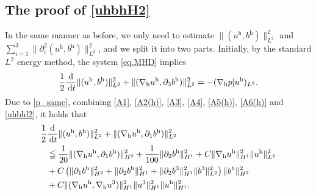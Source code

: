 \documentclass[11pt]{amsart}
\theoremstyle{definition}
\newcommand{\h}{\mathrm{h}}
\newcommand{\dt}{\,{\rm d}t}
\newcommand{\nablah}{\nabla_{\mathrm{h}}}
\numberwithin{equation}{section}
\begin{document}
\subsection{The proof of \eqref{uhbhH2}}
In the same manner as before, we only need to  estimate  $\|(u^\mathrm{h},b^\mathrm{h})\|_{L^2}^2$ and $\sum_{i=1}^{3}\|\partial_{i}^2(u^\mathrm{h},b^\mathrm{h})\|_{L^2}^{2}$, and we split it into  two parts. Initially, by the standard $L^2$ energy method, the system \eqref{eq.MHD} implies
\begin{align}\label{uhbhl2}
	\frac12\frac{\mathrm{d}}{\dt}  \|(u^\mathrm{h},b^\mathrm{h})\|_{L^2}^2 +\|(\nabla_\mathrm{h}u^\mathrm{h},\partial_3 b^\mathrm{h})\|_{ L^2}^2=-(\nablah p|u^\h)_{L^2}.
\end{align}
Due to \eqref{p_same}, combining \eqref{A1}, \eqref{A2(h)}, \eqref{A3}, \eqref{A4}, \eqref{A5(h)}, \eqref{A6(h)} and \eqref{uhbhl2}, it holds that
\begin{align}\label{Esti.h.L2}
	\frac12&\frac{\mathrm{d}}{\dt}  \|(u^\h,b^\h)\|_{L^2}^2 +\|(\nabla_\h u^\h,\partial_1b^\h)\|_{ L^2}^2\nonumber\\
	&\leqq \frac{1}{20}\|(\nablah u^\h,\partial_1b^\h)\|_{H^2}^2 +\frac{1}{100}\|\partial_2b^\h\|_{H^1}^2+C\|\nablah u^\h\|_{H^{1}}^2\|u^\h\|_{L^2}^2\nonumber\\&+C\left(\|\partial_1b^\h\|_{H^2}^2+\|\partial_2b^\h\|_{H^{1}}^2+\|\partial_2b^3\|_{H^1}^2\|b^3\|_{L^{2}}^2\right)\|b^\h\|_{H^{2}}^2\nonumber\\
	&+C\|(\nablah u^\h,\nablah u^3)\|_{H^1}^2\|u^3\|_{H^{1}}^2\| u^\h\|_{H^1}^2.
\end{align}
\end{document}
